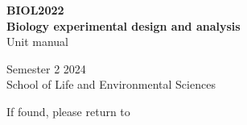 %
%
%
% 


	\RaggedRight
	

	
	
	
	
	{\Huge \textbf{BIOL2022}}\\[0.5\baselineskip]
	{\Huge \textbf{Biology experimental design and analysis}}\\[0.5\baselineskip]
	{\huge Unit manual}
	
	
	
	\vspace{0.05\textheight} %
	
	
	{\Large Semester 2 2024\\[0.3\baselineskip]
	School of Life and Environmental Sciences}
	
	\vfill %
	
	
	
	{\large If found, please return to} 
	
	
	\vspace{0.1\textheight} %
	
	
	
